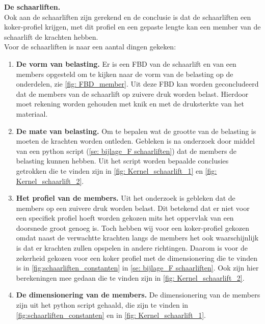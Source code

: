\textbf{De schaarliften.}\\
Ook aan de schaarliften zijn gerekend en de conclusie is dat de schaarliften een koker-profiel krijgen, met dit profiel en een gepaste lengte kan een member van de schaarlift de krachten hebben.\\
Voor de schaarliften is naar een aantal dingen gekeken:\\
\vspace{\baselineskip}
\begin{enumerate}
    \item \textbf{De vorm van belasting.} Er is een FBD van de schaarlift en van een members opgesteld om te kijken naar de vorm van de belasting op de onderdelen, zie \cref{fig: FBD_member}. Uit deze FBD kan worden geconcludeerd dat de members van de schaarlift op zuivere druk worden belast. Hierdoor moet rekening worden gehouden met knik en met de druksterkte van het materiaal.\\
    \item \textbf{De mate van belasting.} Om te bepalen wat de grootte van de belasting is moeten de krachten worden ontleden. Gebleken is na onderzoek door middel van een python script (\cref{se: bijlage_F schaarliften}) dat de members de belasting kunnen hebben. Uit het script worden bepaalde conclusies getrokken die te vinden zijn in \cref{fig: Kernel_schaarlift_1} en \cref{fig: Kernel_schaarlift_2}.\\
    \item \textbf{Het profiel van de members.} Uit het onderzoek is gebleken dat de members op een zuivere druk worden belast. Dit betekend dat er niet voor een specifiek profiel hoeft worden gekozen mits het oppervlak van een doorsnede groot genoeg is. Toch hebben wij voor een koker-profiel gekozen omdat naast de verwachtte krachten langs de members het ook waarschijnlijk is dat er krachten zullen opspelen in andere richtingen. Daarom is voor de zekerheid gekozen voor een koker profiel met de dimensionering die te vinden is in \cref{fig:schaarliften_constanten} in \cref{se: bijlage_F schaarliften}. Ook zijn hier berekeningen mee gedaan die te vinden zijn in \cref{fig: Kernel_schaarlift_2}.\\
    \item \textbf{De dimensionering van de members.} De dimensionering van de members zijn uit het python script gehaald, die zijn te vinden in \cref{fig:schaarliften_constanten} en in \cref{fig: Kernel_schaarlift_1}.
\end{enumerate}
\vspace{\baselineskip}

